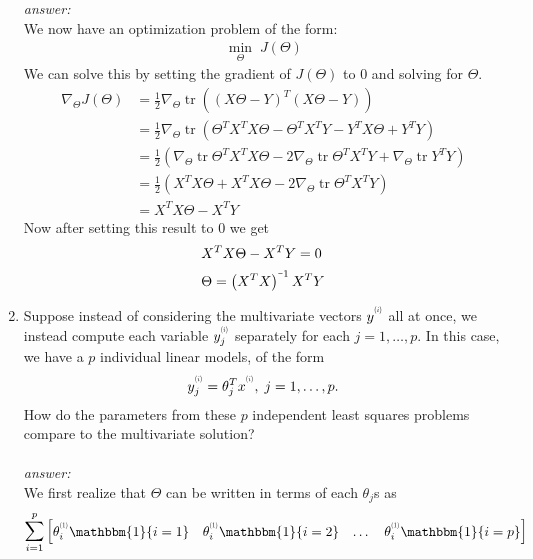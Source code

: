 \documentclass{article}
\DeclareMathOperator{\Tr}{tr}
\newcommand{\minus}{\scalebox{0.5}[1.0]{$-$}}
\newcommand{\supi}[1]{\scalebox{0.6}[0.75]{$^{(#1)}$}}
\begin{document}
\begin{enumerate}[label=(\alph*)]
    \textit{answer:}\\
    We now have an optimization problem of the form:
    \begin{align*}
        \min_{\Theta}\;J(\Theta)
    \end{align*}
    We can solve this by setting the gradient of $J(\Theta)$ to 0 and solving for $\Theta$.
    \begin{align*}
        \nabla_{\Theta}J(\Theta) &{}= \frac{1}{2}\nabla_{\Theta}\Tr\left(\left(X\Theta - Y\right)^T\left(X\Theta - Y\right)\right)\\
        &{}=\frac{1}{2}\nabla_{\Theta}\Tr\left(\Theta^TX^TX\Theta - \Theta^TX^TY - Y^TX\Theta + Y^TY\right)\\
        &{}=\frac{1}{2}\left(\nabla_{\Theta}\Tr\Theta^TX^TX\Theta - 2\nabla_{\Theta}\Tr\Theta^TX^TY + \nabla_{\Theta}\Tr Y^TY\right)\\
        &{}=\frac{1}{2}\left(X^TX\Theta + X^TX\Theta - 2\nabla_{\Theta}\Tr\Theta^TX^TY\right)\\
        &{}=X^TX\Theta - X^TY 
    \end{align*}
    Now after setting this result to 0 we get
    \begin{align*}
        &{}X^TX\Theta - X^TY = 0\\
        &{}\Theta = \left(X^TX\right)^{\minus1} X^TY
    \end{align*}
    \item Suppose instead of considering the multivariate vectors $y^{\supi{i}}$ all at once, we instead compute each variable $y^{\supi{i}}_j$ separately for each $j = 1,\dots, p$. In this case, we have a $p$ individual linear models, of the form
    \begin{align*}
        y^{\supi{i}}_j = \theta^T_jx^{\supi{i}},\;j = 1,\dots, p. 
    \end{align*}
    How do the parameters from these $p$ independent least squares problems compare to the multivariate solution?\\\\
    \textit{answer:}\\
    We first realize that $\Theta$ can be written in terms of each $\theta_j$s as
    \begin{align*}
        \sum_{i=1}^p
        \begin{bmatrix}
            \theta_i^{\supi{1}}\mathbbm{1}\{i=1\} & \theta_i^{\supi{1}}\mathbbm{1}\{i=2\} & \dots & \theta_i^{\supi{1}}\mathbbm{1}\{i=p\} \\

\end{bmatrix}
\end{align*}
\end{enumerate}
\end{document}
